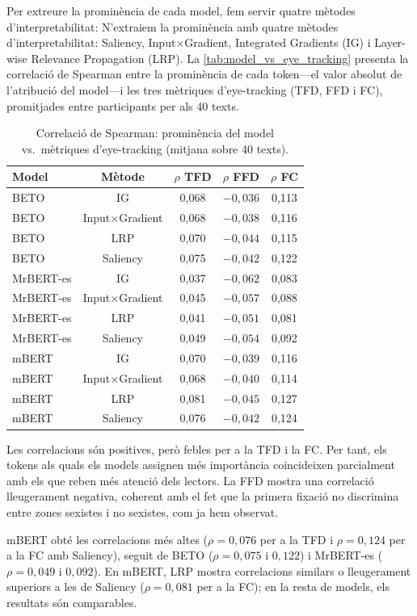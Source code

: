 Per extreure la prominència de cada model, fem servir quatre mètodes d'interpretabilitat: N'extraiem la prominència amb quatre mètodes d'interpretabilitat: Saliency, Input$\times$Gradient, Integrated Gradients (IG) i Layer-wise Relevance Propagation (LRP).
La \autoref{tab:model_vs_eye_tracking} presenta la correlació de Spearman entre la prominència de cada token---el valor absolut de l'atribució del model---i les tres mètriques d'eye-tracking (TFD, FFD i FC), promitjades entre participants per als 40 texts.
\iftables
\begin{table}[htbp]
\small
\centering
\begin{tabular}{lcccc}
\toprule
\textbf{Model} & \textbf{Mètode} & \textbf{$\rho$ TFD} & \textbf{$\rho$ FFD} & \textbf{$\rho$ FC} \\
\midrule
BETO & IG & 0,068 & $-0,036$ & 0,113 \\
BETO & Input$\times$Gradient & 0,068 & $-0,038$ & 0,116 \\
BETO & LRP & 0,070 & $-0,044$ & 0,115 \\
BETO & Saliency & 0,075 & $-0,042$ & 0,122 \\
MrBERT-es & IG & 0,037 & $-0,062$ & 0,083 \\
MrBERT-es & Input$\times$Gradient & 0,045 & $-0,057$ & 0,088 \\
MrBERT-es & LRP & 0,041 & $-0,051$ & 0,081 \\
MrBERT-es & Saliency & 0,049 & $-0,054$ & 0,092 \\
mBERT & IG & 0,070 & $-0,039$ & 0,116 \\
mBERT & Input$\times$Gradient & 0,068 & $-0,040$ & 0,114 \\
mBERT & LRP & 0,081 & $-0,045$ & 0,127 \\
mBERT & Saliency & 0,076 & $-0,042$ & 0,124 \\
\bottomrule
\end{tabular}
\caption{Correlació de Spearman: prominència del model vs.\ mètriques d'eye-tracking (mitjana sobre 40 texts).}
\label{tab:model_vs_eye_tracking}
\end{table}
\fi
Les correlacions són positives, però febles per a la TFD i la FC.
Per tant, els tokens als quals els models assignen més importància coincideixen parcialment amb els que reben més atenció dels lectors.
La FFD mostra una correlació lleugerament negativa, coherent amb el fet que la primera fixació no discrimina entre zones sexistes i no sexistes, com ja hem observat.

mBERT obté les correlacions més altes ($\rho = 0,076$ per a la TFD i $\rho = 0,124$ per a la FC amb Saliency), seguit de BETO ($\rho = 0,075$ i $0,122$) i MrBERT-es ($\rho = 0,049$ i $0,092$).
En mBERT, LRP mostra correlacions similars o lleugerament superiors a les de Saliency ($\rho = 0,081$ per a la FC); en la resta de models, els resultats són comparables.

